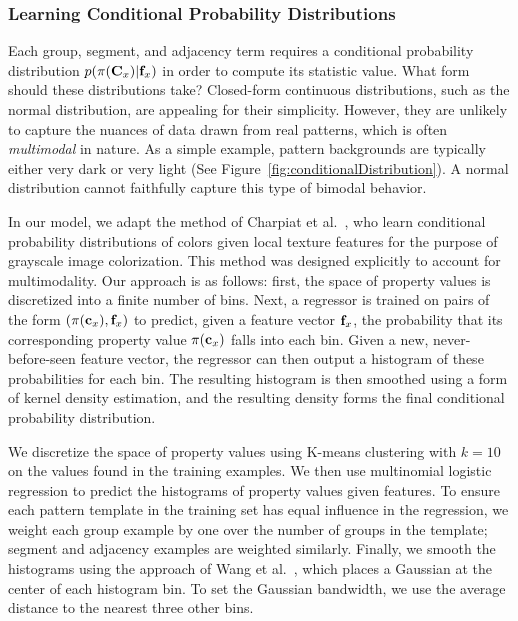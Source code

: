 \subsubsection{Learning Conditional Probability Distributions}
\label{sec:learningPdfs}

Each group, segment, and adjacency term requires a conditional probability distribution $p(\pi(\mathbf{C}_x)|\mathbf{f}_x)$ in order to compute its statistic value. What form should these distributions take? Closed-form continuous distributions, such as the normal distribution, are appealing for their simplicity.  However, they are unlikely to capture the nuances of data drawn from real patterns, which is often \emph{multimodal} in nature. As a simple example, pattern backgrounds are typically either very dark or very light (See Figure~\ref{fig:conditionalDistribution}). A normal distribution cannot faithfully capture this type of bimodal behavior.

In our model, we adapt the method of Charpiat et al.~, who learn conditional probability distributions of colors given local texture features for the purpose of grayscale image colorization. This method was designed explicitly to account for multimodality. Our approach is as follows: first, the space of property values is discretized into a finite number of bins. Next, a regressor is trained on pairs of the form $(\pi(\mathbf{c}_x), \mathbf{f}_x)$ to predict, given a feature vector $\mathbf{f}_x$, the probability that its corresponding property value $\pi(\mathbf{c}_x)$ falls into each bin. Given a new, never-before-seen feature vector, the regressor can then output a histogram of these probabilities for each bin. The resulting histogram is then smoothed using a form of kernel density estimation, and the resulting density forms the final conditional probability distribution.

We discretize the space of property values using K-means clustering with $k = 10$ on the values found in the training examples. We then use multinomial logistic regression to predict the histograms of property values given features. To ensure each pattern template in the training set has equal influence in the regression, we weight each group example by one over the number of groups in the template; segment and adjacency examples are weighted similarly. Finally, we smooth the histograms using the approach of Wang et al.~, which places a Gaussian at the center of each histogram bin. To set the Gaussian bandwidth, we use the average distance to the nearest three other bins.


